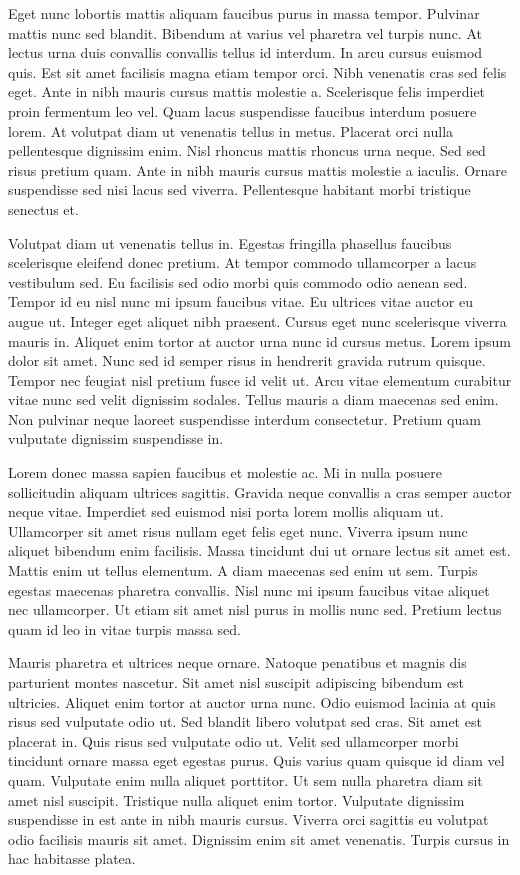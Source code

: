 \documentclass[11pt,a4paper]{article}
\begin{document}
Eget nunc lobortis mattis aliquam faucibus purus in massa tempor. Pulvinar mattis nunc sed blandit. Bibendum at varius vel pharetra vel turpis nunc. At lectus urna duis convallis convallis tellus id interdum. In arcu cursus euismod quis. Est sit amet facilisis magna etiam tempor orci. Nibh venenatis cras sed felis eget. Ante in nibh mauris cursus mattis molestie a. Scelerisque felis imperdiet proin fermentum leo vel. Quam lacus suspendisse faucibus interdum posuere lorem. At volutpat diam ut venenatis tellus in metus. Placerat orci nulla pellentesque dignissim enim. Nisl rhoncus mattis rhoncus urna neque. Sed sed risus pretium quam. Ante in nibh mauris cursus mattis molestie a iaculis. Ornare suspendisse sed nisi lacus sed viverra. Pellentesque habitant morbi tristique senectus et.

Volutpat diam ut venenatis tellus in. Egestas fringilla phasellus faucibus scelerisque eleifend donec pretium. At tempor commodo ullamcorper a lacus vestibulum sed. Eu facilisis sed odio morbi quis commodo odio aenean sed. Tempor id eu nisl nunc mi ipsum faucibus vitae. Eu ultrices vitae auctor eu augue ut. Integer eget aliquet nibh praesent. Cursus eget nunc scelerisque viverra mauris in. Aliquet enim tortor at auctor urna nunc id cursus metus. Lorem ipsum dolor sit amet. Nunc sed id semper risus in hendrerit gravida rutrum quisque. Tempor nec feugiat nisl pretium fusce id velit ut. Arcu vitae elementum curabitur vitae nunc sed velit dignissim sodales. Tellus mauris a diam maecenas sed enim. Non pulvinar neque laoreet suspendisse interdum consectetur. Pretium quam vulputate dignissim suspendisse in.

Lorem donec massa sapien faucibus et molestie ac. Mi in nulla posuere sollicitudin aliquam ultrices sagittis. Gravida neque convallis a cras semper auctor neque vitae. Imperdiet sed euismod nisi porta lorem mollis aliquam ut. Ullamcorper sit amet risus nullam eget felis eget nunc. Viverra ipsum nunc aliquet bibendum enim facilisis. Massa tincidunt dui ut ornare lectus sit amet est. Mattis enim ut tellus elementum. A diam maecenas sed enim ut sem. Turpis egestas maecenas pharetra convallis. Nisl nunc mi ipsum faucibus vitae aliquet nec ullamcorper. Ut etiam sit amet nisl purus in mollis nunc sed. Pretium lectus quam id leo in vitae turpis massa sed.

Mauris pharetra et ultrices neque ornare. Natoque penatibus et magnis dis parturient montes nascetur. Sit amet nisl suscipit adipiscing bibendum est ultricies. Aliquet enim tortor at auctor urna nunc. Odio euismod lacinia at quis risus sed vulputate odio ut. Sed blandit libero volutpat sed cras. Sit amet est placerat in. Quis risus sed vulputate odio ut. Velit sed ullamcorper morbi tincidunt ornare massa eget egestas purus. Quis varius quam quisque id diam vel quam. Vulputate enim nulla aliquet porttitor. Ut sem nulla pharetra diam sit amet nisl suscipit. Tristique nulla aliquet enim tortor. Vulputate dignissim suspendisse in est ante in nibh mauris cursus. Viverra orci sagittis eu volutpat odio facilisis mauris sit amet. Dignissim enim sit amet venenatis. Turpis cursus in hac habitasse platea.
\end{document}
